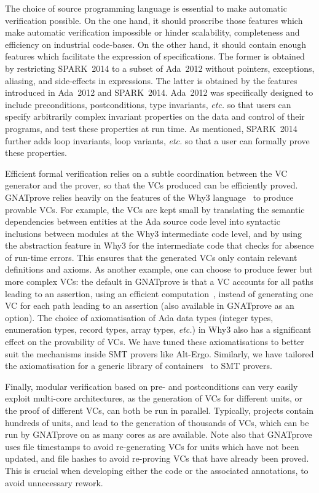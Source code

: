 \documentclass[sttt,final]{svjour}
\newcommand{\gnatprove}{GNATprove\xspace}
\newcommand{\newspark}{SPARK~2014\xspace}
\newcommand{\adatwtw}{Ada~2012\xspace}
\newcommand{\etc}{\textit{etc.}\xspace}
\begin{document}
The choice of source programming language is essential to make
automatic verification possible. On the one hand, it should proscribe
those features which make automatic verification impossible or
hinder scalability, completeness and efficiency on industrial
code-bases.  On the other hand, it should contain enough features which
facilitate the expression of specifications. The former is obtained by
restricting \newspark to a subset of \adatwtw without pointers,
exceptions, aliasing, and side-effects in expressions. The latter is
obtained by the features introduced in \adatwtw and
\newspark. \adatwtw was specifically designed to include
preconditions, postconditions, type invariants, \etc so that users can
specify arbitrarily complex invariant properties on the data and
control of their programs, and test these properties at run time. As
mentioned, \newspark further adds loop invariants, loop variants, \etc
so that a user can formally prove these properties.

Efficient formal verification relies on a subtle coordination between
the VC generator and the prover, so that the VCs produced can be
efficiently proved. \gnatprove relies heavily on the features of the
Why3 language~\cite{guitton2011boogie} to produce provable VCs. For
example, the VCs are kept small by translating the semantic
dependencies between entities at the Ada source code level into
syntactic inclusions between modules at the Why3 intermediate code
level, and by using the abstraction feature in Why3 for the
intermediate code that checks for absence of run-time errors. This
ensures that the generated VCs only contain relevant definitions and
axioms. As another example, one can choose to produce fewer but more
complex VCs: the default in \gnatprove is that a VC accounts for all
paths leading to an assertion, using an efficient
computation~\cite{leino2005ipl}, instead of generating one VC for each
path leading to an assertion (also available in \gnatprove as an
option). The choice of axiomatisation of Ada data types (integer
types, enumeration types, record types, array types, \etc) in Why3
also has a significant effect on the provability of VCs. We have tuned
these axiomatisations to better suit the mechanisms inside SMT provers
like Alt-Ergo. Similarly, we have tailored the axiomatisation for a
generic library of containers~\cite{dross:2011:tap} to SMT provers.

Finally, modular verification based on pre- and postconditions can
very easily exploit multi-core architectures, as the generation of VCs
for different units, or the proof of different VCs, can both be run in
parallel. Typically, projects contain hundreds of units, and lead to
the generation of thousands of VCs, which can be run by \gnatprove on
as many cores as are available. Note also that \gnatprove uses file
timestamps to avoid re-generating VCs for units which have not been
updated, and file hashes to avoid re-proving VCs that have already
been proved. This is crucial when developing either the code or the
associated annotations, to avoid unnecessary rework.
\end{document}
